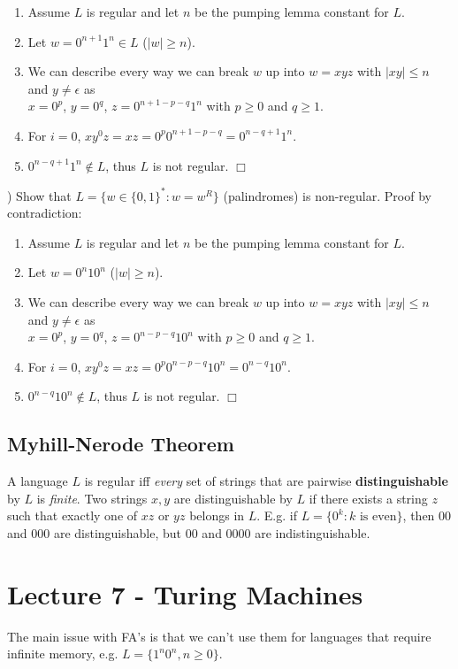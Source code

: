 \documentclass[12pt]{article}
\begin{document}
\begin{enumerate}
    \item Assume $L$ is regular and let $n$ be the pumping lemma constant for $L$.
    \item Let $w = 0^{n + 1} 1^n \in L$ ($|w| \geq n$).
    \item We can describe every way we can break $w$ up into $w = xyz$ with $|xy| \leq n$ and $y \neq \epsilon$ as\\$x = 0^p$, $y = 0^q$, $z = 0^{n + 1 - p - q}1^n$ with $p \geq 0$ and $q \geq 1$.
    \item For $i = 0$, $xy^0z = xz = 0^p 0^{n + 1 - p - q} = 0^{n - q + 1}1^n$.
    \item $0^{n - q + 1}1^n \notin L$, thus $L$ is not regular. $\Box$
\end{enumerate}

) Show that $L = \{w \in \{0, 1\}^* : w = w^R\}$ (palindromes) is non-regular.
Proof by contradiction:

\begin{enumerate}
    \item Assume $L$ is regular and let $n$ be the pumping lemma constant for $L$.
    \item Let $w = 0^n10^n$ ($|w| \geq n$).
    \item We can describe every way we can break $w$ up into $w = xyz$ with $|xy| \leq n$ and $y \neq \epsilon$ as\\$x = 0^p$, $y = 0^q$, $z = 0^{n - p - q}10^n$ with $p \geq 0$ and $q \geq 1$.
    \item For $i = 0$, $xy^0z = xz = 0^p0^{n - p - q}10^n = 0^{n - q}10^n$.
    \item $0^{n - q}10^n \notin L$, thus $L$ is not regular. $\Box$
\end{enumerate}

\subsection*{Myhill-Nerode Theorem}
A language $L$ is regular iff \textit{every} set of strings that are pairwise \textbf{distinguishable} by $L$ is \textit{finite}.
Two strings $x, y$ are distinguishable by $L$ if there exists a string $z$ such that exactly one of $xz$ or $yz$ belongs in $L$.
E.g. if $L = \{0^k : k \text{ is even}\}$, then $00$ and $000$ are distinguishable, but $00$ and $0000$ are indistinguishable.

%
%
\newpage
\section*{Lecture 7 - Turing Machines}
The main issue with FA's is that we can't use them for languages that require infinite memory, e.g. $L = \{1^n 0^n, n \geq 0\}$.
\end{document}
